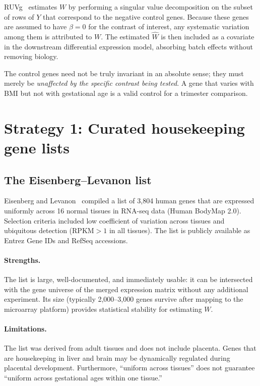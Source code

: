 \documentclass[11pt,a4paper]{article}
\begin{document}
RUVg~\cite{risso2014} estimates $W$ by performing a singular value
decomposition on the subset of rows of $Y$ that correspond to the
negative control genes.  Because these genes are assumed to have
$\beta = 0$ for the contrast of interest, any systematic variation
among them is attributed to $W$.  The estimated $\hat{W}$ is then
included as a covariate in the downstream differential expression
model, absorbing batch effects without removing biology.

The control genes need not be truly invariant in an absolute sense;
they must merely be \emph{unaffected by the specific contrast being
tested}.  A gene that varies with BMI but not with gestational age is a
valid control for a trimester comparison.


\section{Strategy 1: Curated housekeeping gene lists}

\subsection{The Eisenberg--Levanon list}

Eisenberg and Levanon~\cite{eisenberg2013} compiled a list of 3{,}804
human genes that are expressed uniformly across 16 normal tissues in
RNA-seq data (Human BodyMap 2.0).  Selection criteria included low
coefficient of variation across tissues and ubiquitous detection
($\text{RPKM} > 1$ in all tissues).  The list is publicly available as
Entrez Gene IDs and RefSeq accessions.

\paragraph{Strengths.}
The list is large, well-documented, and immediately usable: it can be
intersected with the gene universe of the merged expression matrix
without any additional experiment.  Its size (typically 2{,}000--3{,}000
genes survive after mapping to the microarray platform) provides
statistical stability for estimating $W$.

\paragraph{Limitations.}
The list was derived from adult tissues and does not include placenta.
Genes that are housekeeping in liver and brain may be dynamically
regulated during placental development.  Furthermore, ``uniform across
tissues'' does not guarantee ``uniform across gestational ages within
one tissue.''
\end{document}

